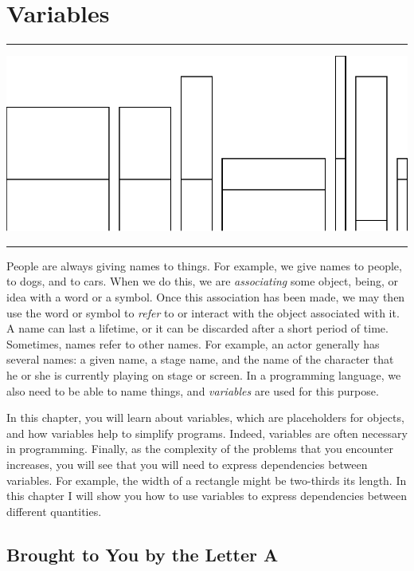 \documentclass[a4paper,10pt,twoside]{book}
\begin{document}
    \sloppy
\fi

\chapter{Variables}\label{cha:variables}

\noindent\hrule
\includegraphics[width=0.9\linewidth]{varTitlePicture}
\noindent\hrule\vspace{1.5cm}

People are always giving names to things. For example, we give names to people, to dogs, 
and to cars. When we do this, we are \emph{associating} some object, being, or idea with a word or a 
symbol. Once this association has been made, we may then use the word or symbol to \emph{refer} to 
or interact with the object associated with it. A name can last a lifetime, or it can be discarded 
after a short period of time. Sometimes, names refer to other names. For example, an actor 
generally has several names: a given name, a stage name, and the name of the character that 
he or she is currently playing on stage or screen. In a programming language, we also need to 
be able to name things, and \emph{variables} are used for this purpose. 


In this chapter, you will learn about variables, which are placeholders for objects, and 
how variables help to simplify programs. Indeed, variables are often necessary in programming. 
Finally, as the complexity of the problems that you encounter increases, you will see that you will 
need to express dependencies between variables. For example, the width of a rectangle might be 
two-thirds its length. In this chapter I will show you how to use variables to express dependencies 
between different quantities.

\section{Brought to You by the Letter A} 
\end{document}

